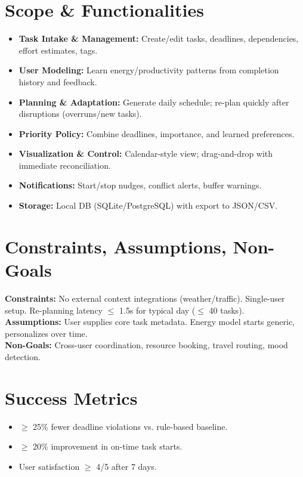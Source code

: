 \documentclass[12pt,oneside]{report}
\begin{document}
\section{Scope \& Functionalities}
\begin{itemize}[leftmargin=1.2cm]
  \item \textbf{Task Intake \& Management:} Create/edit tasks, deadlines, dependencies, effort estimates, tags.
  \item \textbf{User Modeling:} Learn energy/productivity patterns from completion history and feedback.
  \item \textbf{Planning \& Adaptation:} Generate daily schedule; re-plan quickly after disruptions (overruns/new tasks).
  \item \textbf{Priority Policy:} Combine deadlines, importance, and learned preferences.
  \item \textbf{Visualization \& Control:} Calendar-style view; drag-and-drop with immediate reconciliation.
  \item \textbf{Notifications:} Start/stop nudges, conflict alerts, buffer warnings.
  \item \textbf{Storage:} Local DB (SQLite/PostgreSQL) with export to JSON/CSV.
\end{itemize}

\section{Constraints, Assumptions, Non-Goals}
\textbf{Constraints:} No external context integrations (weather/traffic). Single-user setup. Re-planning latency $\leq$ 1.5s for typical day ($\leq$ 40 tasks).\\
\textbf{Assumptions:} User supplies core task metadata. Energy model starts generic, personalizes over time.\\
\textbf{Non-Goals:} Cross-user coordination, resource booking, travel routing, mood detection.

\section{Success Metrics}
\begin{itemize}[leftmargin=1.2cm]
  \item $\geq$ 25\% fewer deadline violations vs. rule-based baseline.
  \item $\geq$ 20\% improvement in on-time task starts.
  \item User satisfaction $\geq$ 4/5 after 7 days.
\end{itemize}

\clearpage
\end{document}
